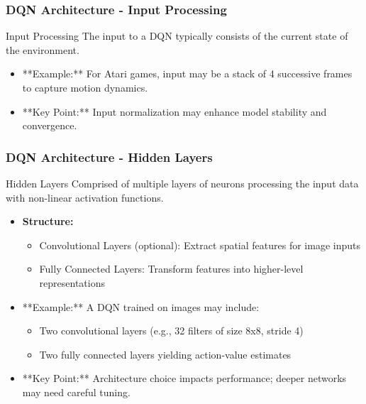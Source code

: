 \documentclass[aspectratio=169]{beamer}
\begin{document}
\begin{frame}[fragile]
    \frametitle{DQN Architecture - Input Processing}
    \begin{block}{Input Processing}
        The input to a DQN typically consists of the current state of the environment.
    \end{block}
    \begin{itemize}
        \item **Example:** For Atari games, input may be a stack of 4 successive frames to capture motion dynamics.
        \item **Key Point:** Input normalization may enhance model stability and convergence.
    \end{itemize}
\end{frame}

\begin{frame}[fragile]
    \frametitle{DQN Architecture - Hidden Layers}
    \begin{block}{Hidden Layers}
        Comprised of multiple layers of neurons processing the input data with non-linear activation functions.
    \end{block}
    \begin{itemize}
        \item \textbf{Structure:}
            \begin{itemize}
                \item Convolutional Layers (optional): Extract spatial features for image inputs
                \item Fully Connected Layers: Transform features into higher-level representations
            \end{itemize}
        \item **Example:** A DQN trained on images may include:
            \begin{itemize}
                \item Two convolutional layers (e.g., 32 filters of size 8x8, stride 4)
                \item Two fully connected layers yielding action-value estimates
            \end{itemize}
        \item **Key Point:** Architecture choice impacts performance; deeper networks may need careful tuning.
    \end{itemize}
\end{frame}
\end{document}
